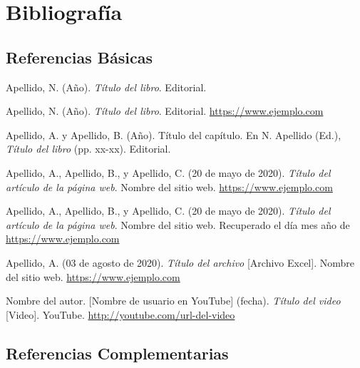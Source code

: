 \section{Bibliografía}


\subsection*{Referencias Básicas}

\hangindent=0.5in
Apellido, N. (Año). \textit{Título del libro}. Editorial.

\hangindent=0.5in
Apellido, N. (Año). \textit{Título del libro}. Editorial. \href{https://www.ejemplo.com}{https://www.ejemplo.com}

\hangindent=0.5in
Apellido, A. y Apellido, B. (Año). Título del capítulo. En N. Apellido (Ed.), \textit{Título del libro} (pp. xx-xx). Editorial.

\hangindent=0.5in
Apellido, A., Apellido, B., y Apellido, C. (20 de mayo de 2020). \textit{Título del artículo de la página web}. Nombre del sitio web. \href{https://www.ejemplo.com}{https://www.ejemplo.com}

\hangindent=0.5in
Apellido, A., Apellido, B., y Apellido, C. (20 de mayo de 2020). \textit{Título del artículo de la página web}. Nombre del sitio web. Recuperado el día mes año de \href{https://www.ejemplo.com}{https://www.ejemplo.com}

\hangindent=0.5in
Apellido, A. (03 de agosto de 2020). \textit{Título del archivo} [Archivo Excel]. Nombre del sitio web. \href{https://www.ejemplo.com}{https://www.ejemplo.com}

\hangindent=0.5in
Nombre del autor. [Nombre de usuario en YouTube] (fecha). \textit{Título del video} [Video]. YouTube. \href{http://youtube.com/url-del-video}{http://youtube.com/url-del-video}

\subsection*{Referencias Complementarias}

